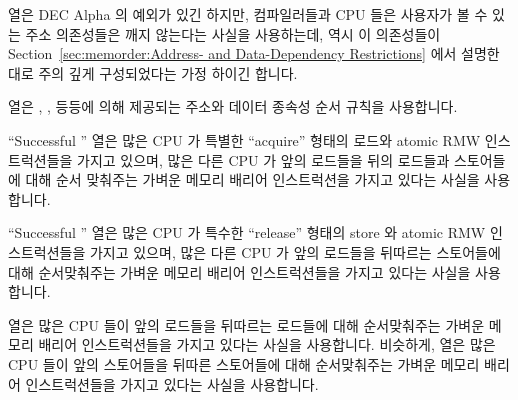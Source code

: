 {	 열은 DEC Alpha 의 예외가 있긴 하지만,
	컴파일러들과 CPU 들은 사용자가 볼 수 있는 주소 의존성들은 깨지 않는다는
	사실을 사용하는데, 역시 이 의존성들이
	Section~\ref{sec:memorder:Address- and Data-Dependency Restrictions}
	에서 설명한 대로 주의 깊게 구성되었다는 가정 하이긴 합니다.

	 열은 ,
	, 등등에 의해 제공되는 주소와 데이터 종속성 순서
	규칙을 사용합니다.

	``Successful '' 열은 많은 CPU 가 특별한 ``acquire''
	형태의 로드와 atomic RMW 인스트럭션들을 가지고 있으며, 많은 다른 CPU 가
	앞의 로드들을 뒤의 로드들과 스토어들에 대해 순서 맞춰주는 가벼운 메모리
	배리어 인스트럭션을 가지고 있다는 사실을 사용합니다.

	``Successful '' 열은 많은 CPU 가 특수한 ``release''
	형태의 store 와 atomic RMW 인스트럭션들을 가지고 있으며, 많은 다른 CPU
	가 앞의 로드들을 뒤따르는 스토어들에 대해 순서맞춰주는 가벼운 메모리
	배리어 인스트럭션들을 가지고 있다는 사실을 사용합니다.

	 열은 많은 CPU 들이 앞의 로드들을 뒤따르는 로드들에 대해
	순서맞춰주는 가벼운 메모리 배리어 인스트럭션들을 가지고 있다는 사실을
	사용합니다.
	비슷하게,
	 열은 많은 CPU 들이 앞의 스토어들을 뒤따른 스토어들에
	대해 순서맞춰주는 가벼운 메모리 배리어 인스트럭션들을 가지고 있다는
	사실을 사용합니다.
	\iffalse

}
